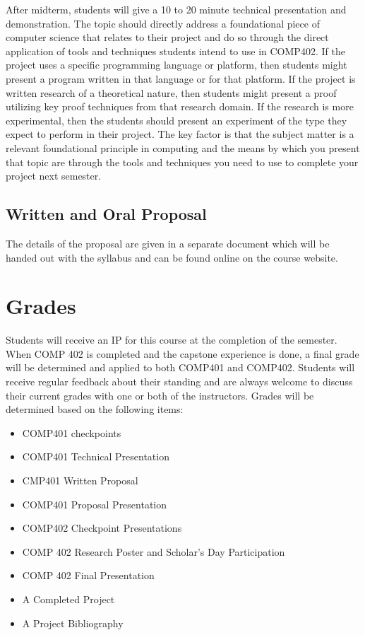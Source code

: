 \documentclass[10pt]{article}
\begin{document}
After midterm, students will give a 10 to 20 minute technical presentation and demonstration. The topic should directly address a foundational piece of computer science that relates to their project and do so through the direct application of tools and techniques students intend to use in COMP402. If the project uses a specific programming language or platform, then students might present a program written in that language or for that platform. If the project is written research of a theoretical nature, then students might present a proof utilizing key proof techniques from that research domain. If the research is more experimental, then the students should present an experiment of the type they expect to perform in their project. The key factor is that the subject matter is a relevant foundational principle in computing and the means by which you present that topic are through the tools and techniques you need to use to complete your project next semester. 


\subsection{Written and Oral Proposal}

The details of the proposal are given in a separate document which will be handed out with the syllabus and can be found online on the course website.

\section{Grades}

Students will receive an IP for this course at the completion of the semester. When COMP 402 is completed and the capstone experience is done, a final grade will be determined and applied to both COMP401 and COMP402. Students will receive regular feedback about their standing and are always welcome to discuss their current grades with one or both of the instructors. Grades will be determined based on the following items:
\begin{itemize}
\item COMP401 checkpoints
\item COMP401 Technical Presentation
\item CMP401 Written Proposal
\item COMP401 Proposal Presentation
\item COMP402 Checkpoint Presentations 
\item COMP 402 Research Poster and Scholar's Day Participation 
\item COMP 402 Final Presentation 
\item A Completed Project
\item A Project Bibliography
\end{itemize}
\end{document}
